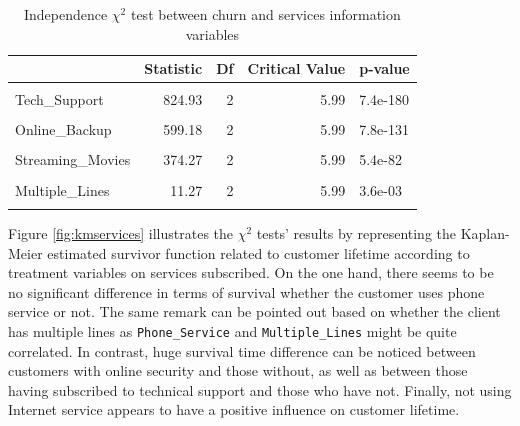 \documentclass[
]{book}
\begin{document}
\begin{table}[H]

\caption{\label{tab:chi2services}Independence $\chi^2$ test between churn and services information variables}
\centering
\begin{tabular}[t]{lrrrl}
\toprule
  & Statistic & Df & Critical Value & p-value\\
\midrule
\cellcolor{gray!6}{Online\_Security} & \cellcolor{gray!6}{846.68} & \cellcolor{gray!6}{2} & \cellcolor{gray!6}{5.99} & \cellcolor{gray!6}{1.4e-184}\\
Tech\_Support & 824.93 & 2 & 5.99 & 7.4e-180\\
\cellcolor{gray!6}{Internet\_Service} & \cellcolor{gray!6}{728.70} & \cellcolor{gray!6}{2} & \cellcolor{gray!6}{5.99} & \cellcolor{gray!6}{5.8e-159}\\
Online\_Backup & 599.18 & 2 & 5.99 & 7.8e-131\\
\cellcolor{gray!6}{Device\_Protection} & \cellcolor{gray!6}{555.88} & \cellcolor{gray!6}{2} & \cellcolor{gray!6}{5.99} & \cellcolor{gray!6}{2e-121}\\
\addlinespace
Streaming\_Movies & 374.27 & 2 & 5.99 & 5.4e-82\\
\cellcolor{gray!6}{Streaming\_TV} & \cellcolor{gray!6}{372.46} & \cellcolor{gray!6}{2} & \cellcolor{gray!6}{5.99} & \cellcolor{gray!6}{1.3e-81}\\
Multiple\_Lines & 11.27 & 2 & 5.99 & 3.6e-03\\
\cellcolor{gray!6}{Phone\_Service} & \cellcolor{gray!6}{0.87} & \cellcolor{gray!6}{1} & \cellcolor{gray!6}{3.84} & \cellcolor{gray!6}{3.5e-01}\\
\bottomrule
\end{tabular}
\end{table}

Figure \ref{fig:kmservices} illustrates the \(\chi^2\) tests' results by representing the Kaplan-Meier estimated survivor function related to customer lifetime according to treatment variables on services subscribed. On the one hand, there seems to be no significant difference in terms of survival whether the customer uses phone service or not. The same remark can be pointed out based on whether the client has multiple lines as \texttt{Phone\_Service} and \texttt{Multiple\_Lines} might be quite correlated. In contrast, huge survival time difference can be noticed between customers with online security and those without, as well as between those having subscribed to technical support and those who have not. Finally, not using Internet service appears to have a positive influence on customer lifetime.
\end{document}
